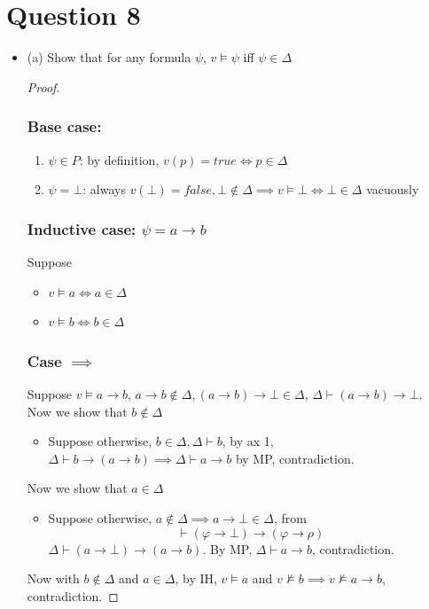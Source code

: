 \documentclass{article}
\begin{document}
\section*{Question 8}
\begin{itemize}
    \item (a) Show that for any formula $\psi$, $v \models \psi$ iff $\psi \in \Delta$
    \begin{proof}
        \subsubsection*{Base case:}
        \begin{enumerate}
            \item $\psi \in P$: by definition, $v(p) = true \iff p \in \Delta$
            \item $\psi = \bot$: always $v(\bot) = false, \bot \notin \Delta \implies v\models \bot \iff \bot \in \Delta$ vacuously
        \end{enumerate}
        \subsubsection*{Inductive case: $\psi = a \rightarrow b$}
        Suppose 
        \begin{itemize}
            \item $v\models a \iff a \in \Delta$
            \item $v\models b \iff b \in \Delta$
        \end{itemize}
        \subsubsection*{Case $\implies$}
        Suppose $v\models a\rightarrow b$, $a \rightarrow b \notin \Delta, (a \rightarrow b) \rightarrow \bot \in \Delta$, 
        $\Delta \vdash (a\rightarrow b)\rightarrow \bot.$\\
        Now we show that $b \notin \Delta$
        \begin{itemize}
            \item Suppose otherwise, $b\in \Delta, \Delta \vdash b$, by ax 1, $\Delta \vdash b \rightarrow (a \rightarrow b) \implies \Delta \vdash a \rightarrow b$ by MP, contradiction.
        \end{itemize}
        Now we show that $a \in \Delta$
        \begin{itemize}
            \item Suppose otherwise, $a \not \in \Delta \implies a \rightarrow \bot \in \Delta$, from 
             \[\vdash (\varphi \rightarrow \bot)\rightarrow (\varphi \rightarrow \rho)\]
            $\Delta \vdash (a \rightarrow \bot) \rightarrow (a \rightarrow b)$. By MP, $\Delta \vdash a \rightarrow b$, contradiction.
        \end{itemize}
        Now with $b \notin \Delta$ and $a \in \Delta$, by IH, $v\models a$ and $v\not \models b \implies v\not \models a\rightarrow b$, contradiction.

\end{proof}
\end{itemize}
\end{document}
